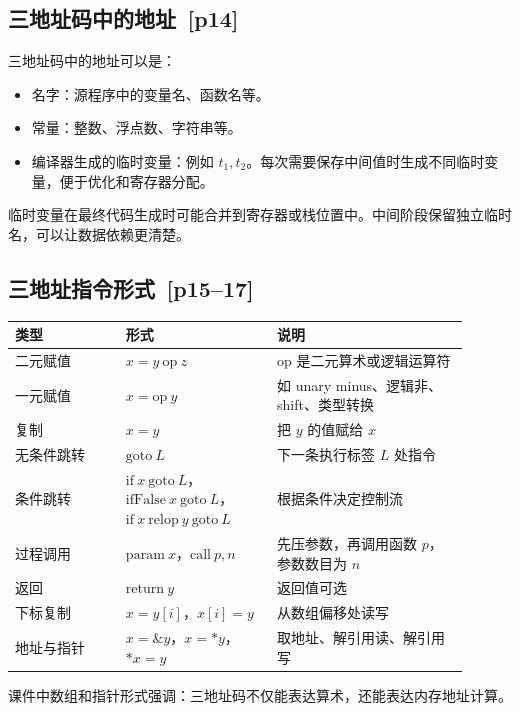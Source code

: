 \documentclass[UTF8,fontset=none,11pt]{ctexart}
\newcommand{\pg}[1]{\texorpdfstring{{\small\color{graytext}\,[p#1]}}{ [p#1]}}
\begin{document}
\subsection{三地址码中的地址 \pg{14}}

三地址码中的地址可以是：

\begin{itemize}
  \item 名字：源程序中的变量名、函数名等。
  \item 常量：整数、浮点数、字符串等。
  \item 编译器生成的临时变量：例如 \(t_1,t_2\)。每次需要保存中间值时生成不同临时变量，便于优化和寄存器分配。
\end{itemize}

临时变量在最终代码生成时可能合并到寄存器或栈位置中。中间阶段保留独立临时名，可以让数据依赖更清楚。

\subsection{三地址指令形式 \pg{15--17}}

\begin{longtable}{L{0.22\linewidth}L{0.30\linewidth}L{0.38\linewidth}}
\toprule
类型 & 形式 & 说明 \\
\midrule
二元赋值 & \(x=y\ \mathrm{op}\ z\) & op 是二元算术或逻辑运算符 \\
一元赋值 & \(x=\mathrm{op}\ y\) & 如 unary minus、逻辑非、shift、类型转换 \\
复制 & \(x=y\) & 把 \(y\) 的值赋给 \(x\) \\
无条件跳转 & \(\mathrm{goto}\ L\) & 下一条执行标签 \(L\) 处指令 \\
条件跳转 & \(\mathrm{if}\ x\ \mathrm{goto}\ L\)，\(\mathrm{ifFalse}\ x\ \mathrm{goto}\ L\)，\(\mathrm{if}\ x\ \mathrm{relop}\ y\ \mathrm{goto}\ L\) & 根据条件决定控制流 \\
过程调用 & \(\mathrm{param}\ x\)，\(\mathrm{call}\ p,n\) & 先压参数，再调用函数 \(p\)，参数数目为 \(n\) \\
返回 & \(\mathrm{return}\ y\) & 返回值可选 \\
下标复制 & \(x=y[i]\)，\(x[i]=y\) & 从数组偏移处读写 \\
地址与指针 & \(x=\&y\)，\(x=*y\)，\(*x=y\) & 取地址、解引用读、解引用写 \\
\bottomrule
\end{longtable}

课件中数组和指针形式强调：三地址码不仅能表达算术，还能表达内存地址计算。
\end{document}
